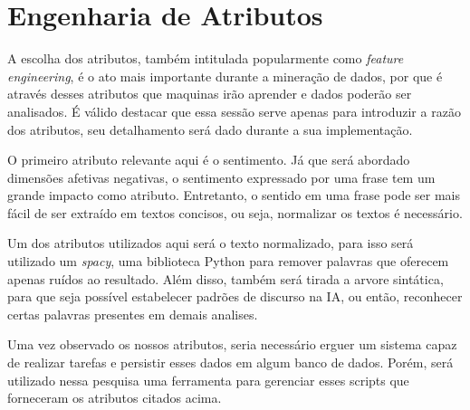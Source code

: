 \section{Engenharia de Atributos}
A escolha dos atributos, também intitulada popularmente como \textit{feature engineering}, é o ato mais importante durante a mineração de dados, por que é através desses atributos que maquinas irão aprender e dados poderão ser analisados. É válido destacar que essa sessão serve apenas para introduzir a razão dos atributos, seu detalhamento será dado durante a sua implementação.

O primeiro atributo relevante aqui é o sentimento. Já que será abordado dimensões afetivas negativas, o sentimento expressado por uma frase tem um grande impacto como atributo. Entretanto, o sentido em uma frase pode ser mais fácil de ser extraído em textos concisos, ou seja, normalizar os textos é necessário.

Um dos atributos utilizados aqui será o texto normalizado, para isso será utilizado um \textit{spacy}, uma biblioteca Python para remover palavras que oferecem apenas ruídos ao resultado. Além disso, também será tirada a arvore sintática, para que seja possível estabelecer padrões de discurso na IA, ou então, reconhecer certas palavras presentes em demais analises.

Uma vez observado os nossos atributos, seria necessário erguer um sistema capaz de realizar tarefas e persistir esses dados em algum banco de dados. Porém, será utilizado nessa pesquisa uma ferramenta para gerenciar esses scripts que forneceram os atributos citados acima.
